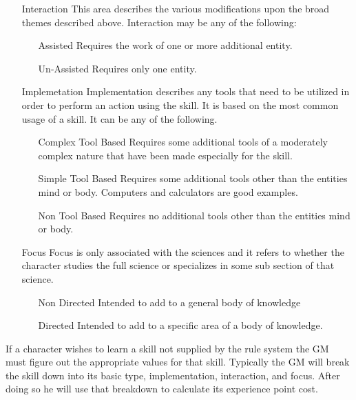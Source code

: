 \begin{itemize}
\begin{itemize}
		Any area of endeavour based on muscle memory training.
		\item[Mental Discipline]
		Any area of endeavour based on purely mental manipulations without
		reference ...\footnote{How in the world do I describe this one}
		\end{itemize}
		\item[Interaction]
		This area describes the various modifications upon the broad themes
		described above. Interaction may be any of the following:
		\begin{itemize}
			\item[Assisted]
			Requires the work of one or more additional entity.
			\item[Un-Assisted]
			Requires only one entity.
		\end{itemize}
	\item[Implemetation]
	Implementation describes any tools that need to be utilized in order
	to perform an action using the skill. It is based on the most common
	usage of a skill. It can be any of the following.
	\begin{itemize}
		\item[Complex Tool Based]
		Requires some additional tools of a moderately complex nature that have been
		made especially for the skill.
		\item[Simple Tool Based]
		Requires some additional tools other than the entities mind or body.
		Computers and calculators are good examples.
		\item[Non Tool Based]
		Requires no additional tools other than the entities mind or body.
	\end{itemize}
	\item[Focus]
	Focus is only associated with the sciences and it refers to whether
	the character studies the full science or specializes in some sub
	section of that science.
	\begin{itemize}
		\item[Non Directed]
		Intended to add to a general body of knowledge
		\item[Directed]
		Intended to add to a specific area of a body of knowledge.
	\end{itemize}
\end{itemize}

\normalsize

If a character wishes to learn a skill not supplied by the rule
system the GM must figure out the appropriate values for that skill.
Typically the GM will break the skill down into its basic type,
implementation, interaction, and focus. After doing so he will use
that breakdown to calculate its experience point cost.

